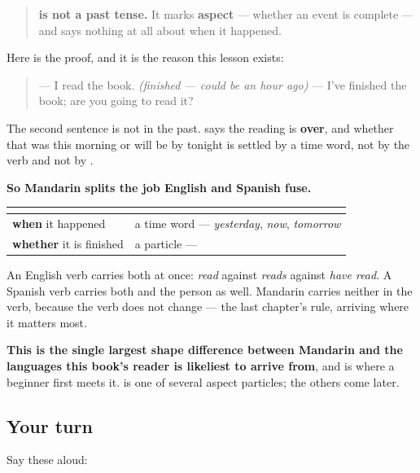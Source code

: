 \begin{grammarlens}[title={Grammar Lens: Mandarin marks completion, not time}]
\begin{quote}
\textbf{ is not a past tense.} It marks \textbf{aspect} — whether an event is complete — and says nothing at all about when it happened.
\end{quote}

Here is the proof, and it is the reason this lesson exists:

\begin{quote}
\textbf{} — I read the book. \emph{(finished — could be an hour ago)} \textbf{} — I've finished the book; are you going to read it?
\end{quote}

The second sentence is not in the past.  says the reading is \textbf{over}, and whether that was this morning or will be by tonight is settled by a time word, not by the verb and not by .

\textbf{So Mandarin splits the job English and Spanish fuse.}

\noindent
\begin{tabularx}{\linewidth}{@{}>{\raggedright\arraybackslash}X>{\raggedright\arraybackslash}X@{}}
\toprule
\textbf{} & \textbf{} \\
\midrule
\textbf{when} it happened & a time word — \emph{yesterday}, \emph{now}, \emph{tomorrow} \\
\textbf{whether} it is finished & a particle — \zh{了} \\
\bottomrule
\end{tabularx}

An English verb carries both at once: \emph{read} against \emph{reads} against \emph{have read}. A Spanish verb carries both and the person as well. Mandarin carries neither in the verb, because the verb does not change — the last chapter's rule, arriving where it matters most.

\textbf{This is the single largest shape difference between Mandarin and the languages this book's reader is likeliest to arrive from}, and  is where a beginner first meets it.  is one of several aspect particles; the others come later.
\end{grammarlens}

\subsection*{Your turn}
Say these aloud:

